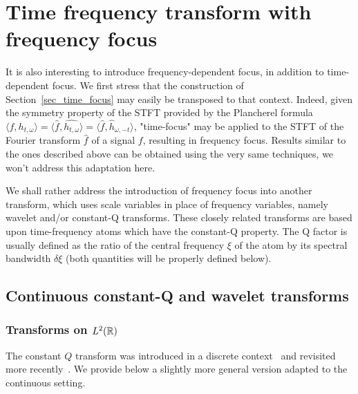 \section{Time frequency transform with frequency focus}\label{sec_frequency_focus}
\label{sec:freqfocus}
It is also interesting to introduce frequency-dependent focus, in addition to time-dependent focus. We first stress that the construction of Section~\ref{sec_time_focus} may easily be transposed to that context. Indeed, given the symmetry property of the STFT provided by the Plancherel formula $\langle f,h_{t,\omega}\rangle = \langle \hat f,\widehat{h_{t,\omega}}\rangle = \langle\hat f,\hat h_{\omega,-t}\rangle$, "time-focus" may be applied to the STFT of the Fourier transform $\hat f$ of a signal $f$, resulting in frequency focus. Results similar to the ones described above can be obtained using the very same techniques, we won't address this adaptation here.

We shall rather address the introduction of frequency focus into another transform, which uses scale variables in place of frequency variables, namely wavelet and/or constant-Q transforms. These closely related transforms are based upon time-frequency atoms which have the constant-Q property. The Q factor is usually defined as the ratio of the central frequency $\xi$ of the atom by its spectral bandwidth $\delta\xi$ (both quantities will be properly defined below).

\subsection{Continuous constant-Q and wavelet transforms}
\subsubsection{Transforms on $L^2(\mathbb{R})$}
The constant $Q$ transform was introduced in a discrete context~\cite{Brown1991calculation} and revisited more recently~\cite{velasco2011constructing,holighaus2012framework}. We provide below a slightly more general version adapted to the continuous setting.


